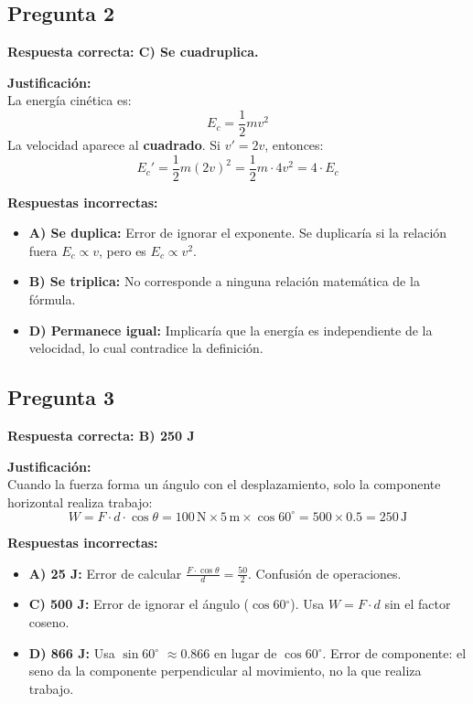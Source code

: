 \begin{respuestabox}
\subsection{Pregunta 2}
\textcolor{verdecorrecto}{\textbf{Respuesta correcta: C) Se cuadruplica.}}

\textbf{Justificación:}\\
La energía cinética es:
$$E_c = \frac{1}{2}mv^2$$
La velocidad aparece al \textbf{cuadrado}. Si $v' = 2v$, entonces:
$$E_c' = \frac{1}{2}m(2v)^2 = \frac{1}{2}m \cdot 4v^2 = 4 \cdot E_c$$

\textbf{Respuestas incorrectas:}
\begin{itemize}
    \item \textbf{A) Se duplica:} Error de ignorar el exponente. Se duplicaría si la relación fuera $E_c \propto v$, pero es $E_c \propto v^2$.
    \item \textbf{B) Se triplica:} No corresponde a ninguna relación matemática de la fórmula.
    \item \textbf{D) Permanece igual:} Implicaría que la energía es independiente de la velocidad, lo cual contradice la definición.
\end{itemize}
\end{respuestabox}

\begin{respuestabox}
\subsection{Pregunta 3}
\textcolor{verdecorrecto}{\textbf{Respuesta correcta: B) 250 J}}

\textbf{Justificación:}\\
Cuando la fuerza forma un ángulo con el desplazamiento, solo la componente horizontal realiza trabajo:
$$W = F \cdot d \cdot \cos\theta = 100\,\text{N} \times 5\,\text{m} \times \cos 60^\circ = 500 \times 0.5 = 250\,\text{J}$$

\textbf{Respuestas incorrectas:}
\begin{itemize}
    \item \textbf{A) 25 J:} Error de calcular $\frac{F \cdot \cos\theta}{d} = \frac{50}{2}$. Confusión de operaciones.
    \item \textbf{C) 500 J:} Error de ignorar el ángulo ($\cos 60$$^\circ$). Usa $W = F \cdot d$ sin el factor coseno.
    \item \textbf{D) 866 J:} Usa $\sin 60$$^\circ$ $\approx 0.866$ en lugar de $\cos 60$$^\circ$. Error de componente: el seno da la componente perpendicular al movimiento, no la que realiza trabajo.
\end{itemize}
\end{respuestabox}

